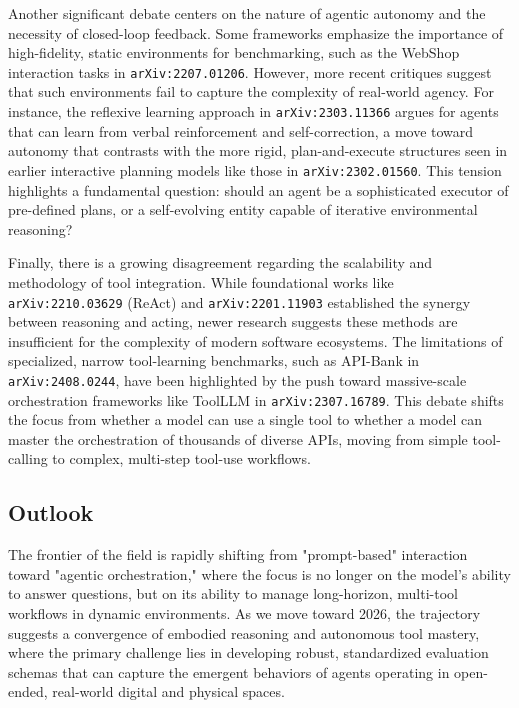 \documentclass[11pt]{article}
\begin{document}
Another significant debate centers on the nature of agentic autonomy and the necessity of closed-loop feedback. Some frameworks emphasize the importance of high-fidelity, static environments for benchmarking, such as the WebShop interaction tasks in \texttt{arXiv:2207.01206}. However, more recent critiques suggest that such environments fail to capture the complexity of real-world agency. For instance, the reflexive learning approach in \texttt{arXiv:2303.11366} argues for agents that can learn from verbal reinforcement and self-correction, a move toward autonomy that contrasts with the more rigid, plan-and-execute structures seen in earlier interactive planning models like those in \texttt{arXiv:2302.01560}. This tension highlights a fundamental question: should an agent be a sophisticated executor of pre-defined plans, or a self-evolving entity capable of iterative environmental reasoning?

Finally, there is a growing disagreement regarding the scalability and methodology of tool integration. While foundational works like \texttt{arXiv:2210.03629} (ReAct) and \texttt{arXiv:2201.11903} established the synergy between reasoning and acting, newer research suggests these methods are insufficient for the complexity of modern software ecosystems. The limitations of specialized, narrow tool-learning benchmarks, such as API-Bank in \texttt{arXiv:2408.0244}, have been highlighted by the push toward massive-scale orchestration frameworks like ToolLLM in \texttt{arXiv:2307.16789}. This debate shifts the focus from whether a model can use a single tool to whether a model can master the orchestration of thousands of diverse APIs, moving from simple tool-calling to complex, multi-step tool-use workflows.

\subsection{Outlook}

The frontier of the field is rapidly shifting from "prompt-based" interaction toward "agentic orchestration," where the focus is no longer on the model's ability to answer questions, but on its ability to manage long-horizon, multi-tool workflows in dynamic environments. As we move toward 2026, the trajectory suggests a convergence of embodied reasoning and autonomous tool mastery, where the primary challenge lies in developing robust, standardized evaluation schemas that can capture the emergent behaviors of agents operating in open-ended, real-world digital and physical spaces.
\end{document}

